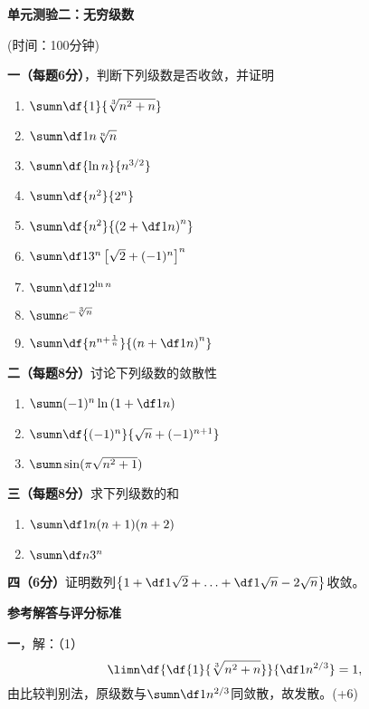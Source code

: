 \begin{center}
	{\Large\bf 单元测验二：无穷级数}
	
	(时间：100分钟)
\end{center}

{\bf 一（每题6分）}，判断下列级数是否收敛，并证明
\begin{enumerate}[(1)]
  \setlength{\itemindent}{1cm}
  \item $\sumn\df{1}{\sqrt[3]{n^2+n}}$
  \item $\sumn\df1{n\sqrt[n]n}$
  \item $\sumn\df{\ln n}{n^{3/2}}$
  \item $\sumn\df{n^2}{2^n}$
  \item $\sumn\df{n^2}{\left(2+\df1n\right)^n}$
  \item $\sumn\df1{3^n}\left[\sqrt2+(-1)^n\right]^n$
  \item $\sumn\df1{2^{\ln n}}$
  \item $\sumn e^{-\sqrt[3]n}$
  \item $\sumn\df{n^{n+\frac1n}}{\left(n+\df1n\right)^n}$
\end{enumerate}

{\bf 二（每题8分）}讨论下列级数的敛散性
\begin{enumerate}[(1)]
  \setlength{\itemindent}{1cm}
  \item $\sumn(-1)^n\ln\left(1+\df1n\right)$
  \item $\sumn\df{(-1)^n}{\sqrt n+(-1)^{n+1}}$
  \item $\sumn\sin(\pi\sqrt{n^2+1})$\quad[提示：已知$\limx{0}\df{\sin x}x=1$]
\end{enumerate}

{\bf 三（每题8分）}求下列级数的和
\begin{enumerate}[(1)]
  \setlength{\itemindent}{1cm}
  \item $\sumn\df1{n(n+1)(n+2)}$
  \item $\sumn\df n{3^n}$
\end{enumerate}

{\bf 四（6分）}证明数列$\left\{1+\df1{\sqrt2}+\ldots
+\df1{\sqrt n}-2\sqrt n\right\}$收敛。

\newpage

\begin{center}
	{\Large\bf 参考解答与评分标准}
\end{center}

{\bf 一}，解：（1）
$$\limn\df{\df{1}{\sqrt[3]{n^2+n}}}{\df1{n^{2/3}}}=1,$$
由比较判别法，原级数与$\sumn\df1{n^{2/3}}$同敛散，故发散。\hfill(+6)

